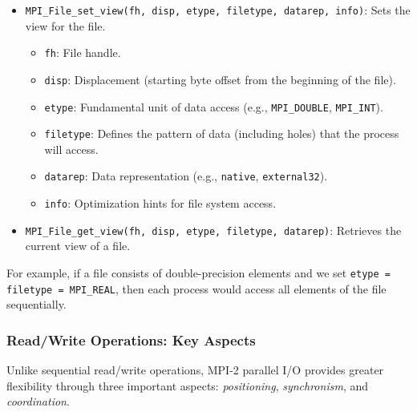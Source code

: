 \documentclass[12pt]{book}
\begin{document}
\begin{itemize}
    \item \texttt{MPI\_File\_set\_view(fh, disp, etype, filetype, datarep, info)}: Sets the view for the file.
    \begin{itemize}
        \item \texttt{fh}: File handle.
        \item \texttt{disp}: Displacement (starting byte offset from the beginning of the file).
        \item \texttt{etype}: Fundamental unit of data access (e.g., \texttt{MPI\_DOUBLE}, \texttt{MPI\_INT}).
        \item \texttt{filetype}: Defines the pattern of data (including holes) that the process will access.
        \item \texttt{datarep}: Data representation (e.g., \texttt{native}, \texttt{external32}).
        \item \texttt{info}: Optimization hints for file system access.
    \end{itemize}

    \item \texttt{MPI\_File\_get\_view(fh, disp, etype, filetype, datarep)}: Retrieves the current view of a file.
\end{itemize}

For example, if a file consists of double-precision elements and we set \texttt{etype = filetype = MPI\_REAL}, then each process would access all elements of the file sequentially.

\subsubsection{Read/Write Operations: Key Aspects}
Unlike sequential read/write operations, MPI-2 parallel I/O provides greater flexibility through three important aspects: \emph{positioning}, \emph{synchronism}, and \emph{coordination}.
\end{document}
